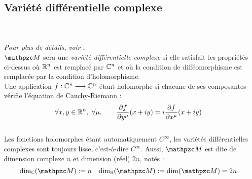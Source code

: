 
\subsection{\wip Variété différentielle complexe }\label{ann:VDC}

\\ \\
\textit{Pour plus de détails, voir \cite{nakahara_geometry_2003, ballmann_lectures_2006}.}
\\

$\manu$ sera une \emph{variété différentielle complexe} si elle satisfait les propriétés ci-dessus où $\mathbb{R}^n$ est remplacé par $\mathbb{C}^n$ et où la condition de difféomorphisme est remplacée par la condition d'holomorphisme. 
\\
Une application $f : \mathbb{C}^n\longrightarrow \mathbb{C}^n$ étant holomorphe si chacune de ses composantes vérifie l'équation de Cauchy-Riemann :
\[\forall x,y\in\R^n,\ \forall \mu,\qquad \frac{\partial f }{\partial y^\mu}(x+iy) = i \frac{\partial f }{\partial x^\mu}(x+iy)\]
\\
Les fonctions holomorphes étant automatiquement $C^\infty$, les variétés différentielles complexes sont toujours lisse, c'est-à-dire $C^\infty$. Aussi, $\manu$ est dite de dimension complexe $n$ et dimension (réel) $2n$, notés :
\begin{align}\label{eq:manuC-base_cano}
	\dim[\C](\manu) &\defeq n  &  \dim[\R] (\manu) \defeq \dim (\manu) = 2n
\end{align}
\\

